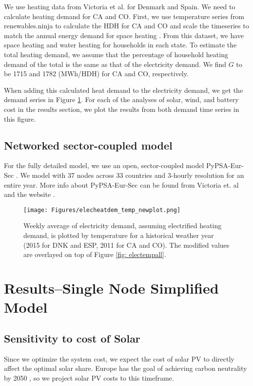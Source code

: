 \documentclass[lettersize,journal]{IEEEtran}
\begin{document}
We use heating data from Victoria et al. for Denmark and Spain. We need to calculate heating demand for CA and CO. First, we use temperature series from renewables.ninja\cite{renewableninja, STAFFELL20161224, PFENNINGER20161251} to calculate the HDH for CA and CO and scale the timeseries to match the annual energy demand for space heating \cite{EIA_dataset}. From this dataset, we have space heating and water heating for households in each state. To estimate the total heating demand, we assume that the percentage of household heating demand of the total is the same as that of the electricity demand. We find $G$ to be 1715 and 1782 (MWh/HDH) for CA and CO, respectively. 

When adding this calculated heat demand to the electricity demand, we get the demand series in Figure \ref{fig: tempincreaseall}. For each of the analyses of solar, wind, and battery cost in the results section, we plot the results from both demand time series in this figure. 

\subsection{Networked sector-coupled model}
For the fully detailed model, we use an open, sector-coupled model PyPSA-Eur-Sec \cite{pypsa_eur_sec}. We model with 37 nodes across 33 countries and 3-hourly resolution for an entire year.  More info about PyPSA-Eur-Sec can be found from Victoria et. al \cite{victoria_speed_2022} and the website \cite{readthedocs}.

\begin{figure}[H]
\centering
\texttt{[image: Figures/elecheatdem\_temp\_newplot.png]}
\caption{Weekly average of electricity demand, assuming electrified heating demand, is plotted by temperature for a historical weather year (2015 for DNK and ESP, 2011 for CA and CO). The modified values are overlayed on top of Figure \ref{fig: electempall}. }
\label{fig: tempincreaseall} 
\end{figure}


\section{Results--Single Node Simplified Model} 

\subsection{Sensitivity to cost of Solar}
Since we optimize the system cost, we expect the cost of solar PV to directly affect the optimal solar share. Europe has the goal of achieving carbon neutrality by 2050 \cite{Europe_climate_goal}, so we project solar PV costs to this timeframe.
\end{document}
